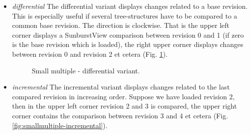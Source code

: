 \begin{itemize}
\item \emph{differential} The differential variant displays changes related to a base revision. This is especially useful if several tree-structures have to be compared to a common base revision. The direction is clockwise. That is the upper left corner displays a SunburstView comparison between revision 0 and 1 (if zero is the base revision which is loaded), the right upper corner displays changes between revision 0 and revision 2 et cetera (Fig. \ref{fig:smallmultiple-differential}).

\begin{figure}[tb]
\caption{\label{fig:smallmultiple-differential} Small multiple - differential variant.}
\end{figure}

\item \emph{incremental} The incremental variant displays changes related to the last compared revision in increasing order. Suppose we have loaded revision 2, then in the upper left corner revision 2 and 3 is compared, the upper right corner contains the comparison between revision 3 and 4 et cetera (Fig. \ref{fig:smallmultiple-incremental}).


\end{itemize}
